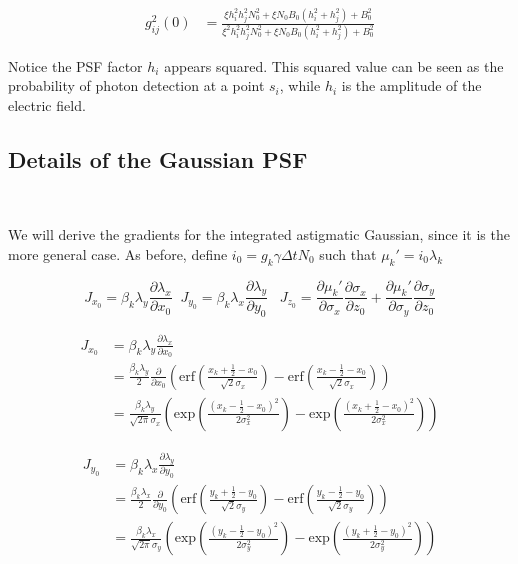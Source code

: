 \begin{align*}
g^{2}_{ij}(0) &= \frac{\xi h_{i}^{2}h_{j}^{2}N_{0}^{2} + \xi N_{0}B_{0}(h_{i}^{2} + h_{j}^{2}) + B_{0}^{2}}{\xi^{2} h_{i}^{2}h_{j}^{2}N_{0}^{2} + \xi N_{0}B_{0}(h_{i}^{2}+h_{j}^{2}) +  B_{0}^{2}}
\end{align*}

Notice the PSF factor $h_{i}$ appears squared. This squared value can be seen as the probability of photon detection at a point $s_i$, while $h_{i}$ is the amplitude of the electric field. 

\subsection{Details of the Gaussian PSF}\

We will derive the gradients for the integrated astigmatic Gaussian, since it is the more general case. As before, define $i_{0} = g_{k}\gamma\Delta t N_{0}$ such that $\mu_{k}' = i_{0}\lambda_{k}$

\begin{equation*}
J_{x_{0}} = \beta_{k}\lambda_{y}\frac{\partial \lambda_{x}}{\partial x_{0}} \;\; J_{y_{0}} = \beta_{k}\lambda_{x}\frac{\partial \lambda_{y}}{\partial y_{0}}\;\;\; J_{z_{0}}  = \frac{\partial \mu_{k}'}{\partial \sigma_{x}}\frac{\partial \sigma_{x}}{\partial z_{0}} + \frac{\partial \mu_{k}'}{\partial \sigma_{y}}\frac{\partial \sigma_{y}}{\partial z_{0}}
\end{equation*}

\begin{align*}
J_{x_{0}} &= \beta_{k}\lambda_{y}\frac{\partial \lambda_{x}}{\partial x_{0}} \\
&= \frac{\beta_{k}\lambda_{y}}{2}\frac{\partial}{\partial x_{0}}\left(\mathrm{erf}\left(\frac{x_{k}+\frac{1}{2}-x_{0}}{\sqrt{2}\sigma_{x}}\right) -\mathrm{erf}\left(\frac{x_{k}-\frac{1}{2}-x_{0}}{\sqrt{2}\sigma_{x}}\right)\right)\\
&= \frac{\beta_{k}\lambda_{y}}{\sqrt{2\pi}\sigma_{x}}\left(\mathrm{exp}\left(\frac{(x_{k}-\frac{1}{2}-x_{0})^{2}}{2\sigma_{x}^{2}}\right) -\mathrm{exp}\left(\frac{(x_{k}+\frac{1}{2}-x_{0})^{2}}{2\sigma_{x}^{2}}\right)\right)
\end{align*}

\begin{align*}
J_{y_{0}} &= \beta_{k}\lambda_{x}\frac{\partial \lambda_{y}}{\partial y_{0}} \\
&= \frac{\beta_{k}\lambda_{x}}{2}\frac{\partial}{\partial y_{0}}\left(\mathrm{erf}\left(\frac{y_{k}+\frac{1}{2}-y_{0}}{\sqrt{2}\sigma_{y}}\right) -\mathrm{erf}\left(\frac{y_{k}-\frac{1}{2}-y_{0}}{\sqrt{2}\sigma_{y}}\right)\right)\\
&= \frac{\beta_{k}\lambda_{x}}{\sqrt{2\pi}\sigma_{y}}\left(\mathrm{exp}\left(\frac{(y_{k}-\frac{1}{2}-y_{0})^{2}}{2\sigma_{y}^{2}}\right) -\mathrm{exp}\left(\frac{(y_{k}+\frac{1}{2}-y_{0})^{2}}{2\sigma_{y}^{2}}\right)\right)
\end{align*}

